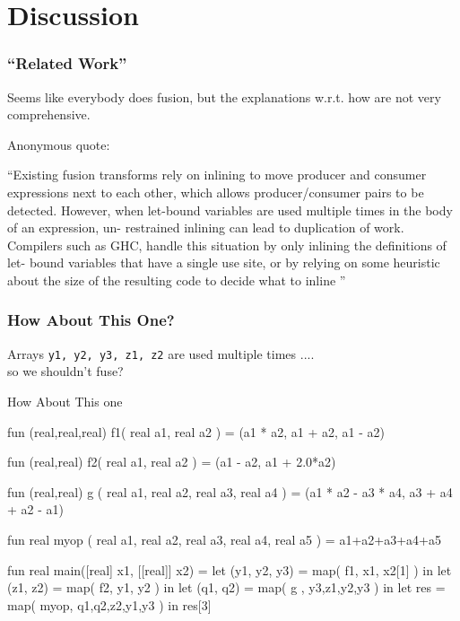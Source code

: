 \documentclass{beamer}
\renewcommand{\emph}[1]{\textcolor{structure}{#1}}
\newcommand{\emp}[1]{\textcolor{DikuRed}{ #1}}
\begin{document}
\section{Discussion}
\begin{frame}[fragile,t]
  \frametitle{``Related Work''}

  \emp{Seems like everybody does fusion, but the explanations w.r.t. how are not very comprehensive.}

  \bigskip
  Anonymous quote:

  \smallskip

  \emph{``Existing fusion transforms rely on inlining to move producer
    and consumer expressions next to each other, which allows
    producer/consumer pairs to be detected. However, when let-bound
    variables are used multiple times in the body of an expression,
    un- restrained inlining can lead to duplication of work. Compilers
    such as GHC, handle this situation by only inlining the
    definitions of let- bound variables that have a single use site,
    or by relying on some heuristic about the size of the resulting
    code to decide what to inline ''}

\end{frame}


\begin{frame}[fragile,t]
  \frametitle{How About This One?}

  Arrays \texttt{y1, y2, y3, z1, z2} are used multiple times .... \\ \emp{so we shouldn't fuse?}

  \begin{block}{How About This one}
    \begin{colorcode}[fontsize=\scriptsize]
      fun (real,real,real) f1( real a1, real a2 ) =
        (a1 * a2, a1 + a2, a1 - a2)

      fun (real,real)      f2( real a1, real a2 ) =
        (a1 - a2, a1 + 2.0*a2)

      fun (real,real)      g ( real a1, real a2, real a3, real a4 ) =
        (a1 * a2 - a3 * a4, a3 + a4 + a2 - a1)

      fun real myop ( real a1, real a2, real a3, real a4, real a5 ) =
        a1+a2+a3+a4+a5

      fun real main([real] x1, [[real]] x2) =
        let (y1, y2, y3) = map( f1, x1, x2[1] )        in
        let (z1, z2)     = map( f2, y1, y2 )           in
        let (q1, q2)     = map( g , y3,z1,y2,y3 )      in
        let res          = map( myop, q1,q2,z2,y1,y3 ) in
        res[3]
    \end{colorcode}
  \end{block}

\end{frame}
\end{document}

